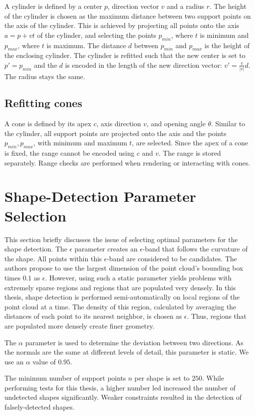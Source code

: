 A cylinder is defined by a center $p$, direction vector $v$ and a radius $r$. The height of the cylinder is chosen as the maximum distance between two support points on the axis of the cylinder. This is achieved by projecting all points onto the axis $a = p + vt$ of the cylinder, and selecting the points $p_{min}$, where $t$ is minimum and $p_{max}$, where $t$ is maximum. The distance $d$ between $p_{min}$ and $p_{max}$ is the height of the enclosing cylinder. The cylinder is refitted such that the new center is set to $p' = p_{min}$ and the $d$ is encoded in the length of the new direction vector: $v' = \frac{v}{|v|}d$. The radius stays the same. 


\subsection{Refitting cones}

A cone is defined by its apex $c$, axis direction $v$, and opening angle $\theta$. Similar to the cylinder, all support points are projected onto the axis and the points $p_{min}, p_{max}$, with minimum and maximum $t$, are selected. Since the apex of a cone is fixed, the range cannot be encoded using $c$ and $v$. The range is stored separately. Range checks are performed when rendering or interacting with cones. 


\section{Shape-Detection Parameter Selection}
\label{sec:shapeDetectionParameterSelection}

This section briefly discusses the issue of selecting optimal parameters for the shape detection. The $\epsilon$ parameter creates an $\epsilon$-band that follows the curvature of the shape. All points within this $\epsilon$-band are considered to be candidates. The authors propose to use the largest dimension of the point cloud's bounding box times $0.1$ as $\epsilon$. However, using such a static parameter yields problems with extremely sparse regions and regions that are populated very densely. In this thesis, shape detection is performed semi-automatically on local regions of the point cloud at a time. The density of this region, calculated by averaging the distances of each point to its nearest neighbor, is chosen as $\epsilon$. Thus, regions that are populated more densely create finer geometry. 

The $\alpha$ parameter is used to determine the deviation between two directions. As the normals are the same at different levels of detail, this parameter is static. We use an $\alpha$ value of $0.95$. 

The minimum number of support points $n$ per shape is set to $250$. While performing tests for this thesis, a higher number led increased the number of undetected shapes significantly. Weaker constraints resulted in the detection of falsely-detected shapes. 